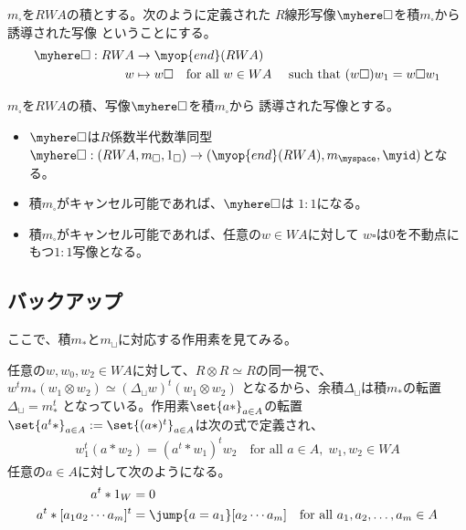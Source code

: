 		\begin{definition}[積から誘導された写像]\label{def:積から誘導された写像} %
			$m_\square$を$RWA$の積とする。次のように定義された
			$R$線形写像$\myhere\square$を積$m_\square$から誘導された写像
			ということにする。
			\begin{equation*}\begin{split} %
				\myhere\square: RWA&\to \myop{end}(RWA) \\
				w &\mapsto w\square \quad\text{for all }w\in WA\quad\text{ such that }
					(w\square)w_1 = w\square w_1
			\end{split}\end{equation*} %
		\end{definition} %
		\begin{proposition}[積から誘導された写像のもつ性質]\label{prop:積から誘導された写像のもつ性質} %
			$m_\square$を$RWA$の積、写像$\myhere\square$を積$m_\square$から
			誘導された写像とする。
			\begin{itemize}\setlength{\itemsep}{-1mm} %
				\item $\myhere\square$は$R$係数半代数準同型
				$\myhere\square:(RWA,m_\square,1_\square)
				\to(\myop{end}(RWA),m_\myspace,\myid)$となる。
				\item 積$m_\square$がキャンセル可能であれば、$\myhere\square$は
				$1:1$になる。
				\item 積$m_\square$がキャンセル可能であれば、任意の$w\in WA$に対して
				$w\square$は$0$を不動点にもつ$1:1$写像となる。
			\end{itemize} %
		\end{proposition} %

	\subsection{バックアップ}\label{s2:バックアップ} %
		ここで、積$m_*$と$m_\sqcup$に対応する作用素を見てみる。

		任意の$w,w_0,w_2\in WA$に対して、$R\otimes R\simeq R$の同一視で、
		$w^tm_*(w_1\otimes w_2)\simeq(\Delta_\sqcup w)^t(w_1\otimes w_2)$
		となるから、余積$\Delta_\sqcup$は積$m_*$の転置$\Delta_\sqcup=m_*^t$
		となっている。作用素$\set{a*}_{a\in A}$の転置
		$\set{a^t*}_{a\in A}:=\set{(a*)^t}_{a\in A}$は次の式で定義され、
		\begin{equation*}\begin{split} %
			w_1^t(a*w_2)=(a^t*w_1)^tw_2 \quad\text{for all }a\in A,\;w_1,w_2\in WA
		\end{split}\end{equation*} %
		任意の$a\in A$に対して次のようになる。
		\begin{equation*}\begin{split} %
			a^t*1_W &= 0 \\
			a^t*[a_1a_2\cdots a_m]^t &= \jump{a=a_1}[a_2\cdots a_m] 
			\quad\text{for all }a_1,a_2,\dots,a_m\in A
		\end{split}\end{equation*} %

